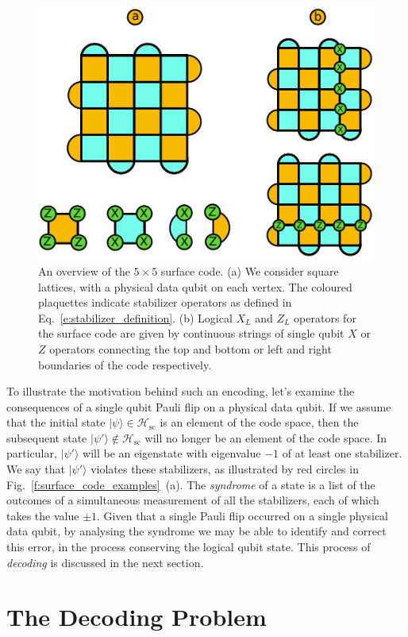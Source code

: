 \documentclass[twocolumn,preprintnumbers,amsmath,amssymb,notitlepage,nofootinbib,longbibliography,superscriptaddress,aps,pra,10pt]{revtex4-1}
\begin{document}
	\begin{figure}
		\centering
		\includegraphics[width=0.8\linewidth]{figures/surface_code.pdf}
		\caption{
			An overview of the $5 \times 5$ surface code.
			(a) We consider square lattices, with a physical data qubit on each vertex.
			The coloured plaquettes indicate stabilizer operators as defined in Eq.~\eqref{e:stabilizer_definition}.
			(b) Logical $X_L$ and $Z_L$ operators for the surface code are given by continuous strings of single qubit $X$ or $Z$ operators connecting the top and bottom or left and right boundaries of the code respectively.
		}
		\label{f:surface_code}
	\end{figure}

	To illustrate the motivation behind such an encoding, let's examine the consequences of a single qubit Pauli flip on a physical data qubit.
	If we assume that the initial state $|\psi\rangle \in \mathcal{H}_\mathrm{sc}$ is an element of the code space, then the subsequent state $|\psi'\rangle \not \in \mathcal{H}_\mathrm{sc}$ will no longer be an element of the code space.
	In particular, $|\psi'\rangle$ will be an eigenstate with eigenvalue $-1$ of at least one stabilizer.
	We say that $|\psi'\rangle$ violates these stabilizers, as illustrated by red circles in Fig.~\ref{f:surface_code_examples}~(a).
	The \textit{syndrome} of a state is a list of the outcomes of a simultaneous measurement of all the stabilizers, each of which takes the value $\pm 1$.
	Given that a single Pauli flip occurred on a single physical data qubit, by analysing the syndrome we may be able to identify and correct this error, in the process conserving the logical qubit state. 
	This process of \textit{decoding} is discussed in the next section.

\section{The Decoding Problem}\label{s:the_decoding_problem}
\end{document}
